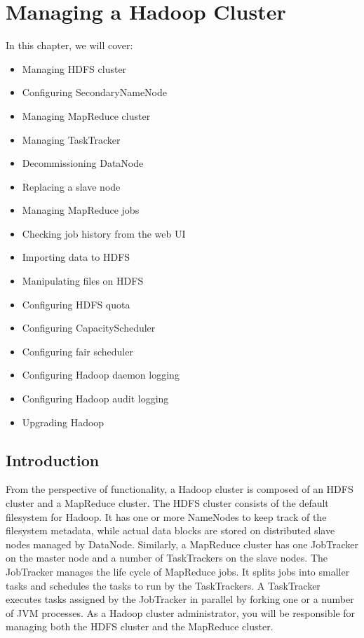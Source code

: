 \chapter{Managing a Hadoop Cluster}\label{chap:4}
In this chapter, we will cover: \\
\begin{itemize}
  \item Managing HDFS cluster
  \item Configuring SecondaryNameNode
  \item Managing MapReduce cluster
  \item Managing TaskTracker
  \item Decommissioning DataNode
  \item Replacing a slave node
  \item Managing MapReduce jobs
  \item Checking job history from the web UI
  \item Importing data to HDFS
  \item Manipulating files on HDFS
  \item Configuring HDFS quota
  \item Configuring CapacityScheduler
  \item Configuring fair scheduler
  \item Configuring Hadoop daemon logging
  \item Configuring Hadoop audit logging
  \item Upgrading Hadoop
\end{itemize}

\section{Introduction}
From the perspective of functionality, a Hadoop cluster is composed of an HDFS cluster and a MapReduce cluster. The HDFS cluster consists of the default filesystem for Hadoop. It has one or more NameNodes to keep track of the filesystem metadata, while actual data blocks are stored on distributed slave nodes managed by DataNode. Similarly, a MapReduce cluster has one JobTracker on the master node and a number of TaskTrackers on the slave nodes. The JobTracker manages the life cycle of MapReduce jobs. It splits jobs into smaller tasks and schedules the tasks to run by the TaskTrackers. A TaskTracker executes tasks assigned by the JobTracker in parallel by forking one or a number of JVM processes. As a Hadoop cluster administrator, you will be responsible for managing both the HDFS cluster and the MapReduce cluster.

